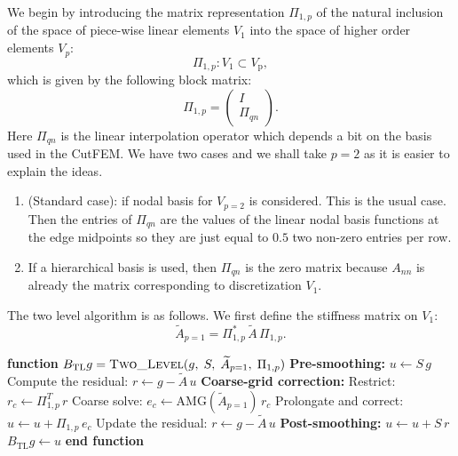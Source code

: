 \documentclass[11pt]{article}
\theoremstyle{remark}
\begin{document}
We begin by introducing the matrix representation $\Pi_{1,p}$ of the natural inclusion of the space of piece-wise linear elements $V_1$ into the space of higher order elements $V_p$:
\[\Pi_{1,p} : V_{1}\subset V_{\text{p}},\] 
which is given by the following block matrix:
\begin{equation}
\Pi_{1,p} = \begin{pmatrix}
    I \\
    \Pi_{qn}
  \end{pmatrix}.
\end{equation}
Here $\Pi_{qn}$ is the linear interpolation operator which depends a bit on the basis used in the CutFEM. We have two cases and we shall take $p=2$ as it is easier to explain the ideas.
\begin{enumerate}
\item (Standard case):
   if nodal basis for $V_{p=2}$ is considered. This is the usual case. Then the entries of $\Pi_{qn}$ are the values of the linear nodal basis functions at the edge midpoints so they are just equal to $0.5$ two non-zero entries per row. 
\item If a hierarchical basis is used, then $\Pi_{qn}$ is the zero matrix because $A_{nn}$ is already the matrix corresponding to discretization $V_1$.
\end{enumerate}

The two level algorithm is as follows. We first define the stiffness matrix on $V_1$:
\begin{equation}
  \widetilde{A}_{p=1} = \Pi_{1,p}^{*}\,\widetilde{A}\,\Pi_{1,p}.
\end{equation}

\begin{algorithm}[H]
\caption{Two-level preconditioner for higher-order CutFEM: $B_{\mathrm{TL}}\, g$}
\label{alg:two-level}
\begin{algorithmic}[1]
\medskip
\STATE \textbf{function} $B_{\mathrm{TL}}g = \textsc{Two\_Level}(g,\; S,\; \widetilde{A}_{p=1},\; \Pi_{1,p})$
\medskip
\STATE \quad \textbf{Pre-smoothing:} $u \leftarrow S\, g$ 
\STATE \quad Compute the residual: $r \leftarrow g - \widetilde{A}\, u$
\STATE \quad \textbf{Coarse-grid correction:}
\STATE \qquad Restrict: $r_c \leftarrow \Pi_{1,p}^{T}\, r$
\STATE \qquad Coarse solve: $e_c \leftarrow \mathrm{AMG}(\widetilde{A}_{p=1})\, r_c$ 
\STATE \qquad Prolongate and correct: $u \leftarrow u + \Pi_{1,p}\, e_c$
\STATE \quad Update the residual: $r \leftarrow g - \widetilde{A}\, u$
\STATE \quad \textbf{Post-smoothing:} $u \leftarrow u + S\, r$
\STATE \quad \RETURN $B_{\mathrm{TL}}g \leftarrow u$
\STATE \textbf{end function}
\end{algorithmic}
\end{algorithm}
\end{document}
